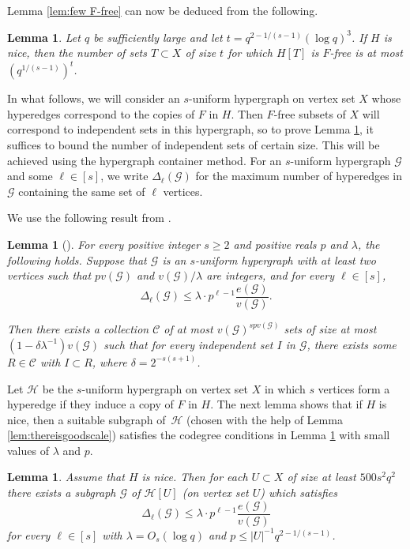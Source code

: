 \documentclass[11pt]{article}
\theoremstyle{plain}
\newtheorem{lemma}[theorem]{Lemma}
\theoremstyle{definition}
\begin{document}
Lemma \ref{lem:few F-free} can now be deduced from the following.

\begin{lemma} \label{lem:few F-free if nice}
    Let $q$ be sufficiently large and let $t=q^{2-1/(s-1)}(\log q)^{3}$. If $H$ is nice, then the number of sets $T\subset X$ of size $t$ for which $H[T]$ is $F$-free is at most $(q^{1/(s-1)})^t$.
\end{lemma}

In what follows, we will consider an $s$-uniform hypergraph on vertex set $X$ whose hyperedges correspond to the copies of $F$ in $H$. Then $F$-free subsets of $X$ will correspond to independent sets in this hypergraph, so to prove Lemma \ref{lem:few F-free if nice}, it suffices to bound the number of independent sets of certain size. This will be achieved using the hypergraph container method. For an $s$-uniform hypergraph $\mathcal{G}$ and some $\ell \in [s]$, we write $\Delta_{\ell}(\mathcal{G})$ for the maximum number of hyperedges in $\mathcal{G}$ containing the same set of $\ell$ vertices.

We use the following result from \cite{Janzer_Sudakov}.

\begin{lemma}[{\cite[Corollary 2.8]{Janzer_Sudakov}}] \label{lem:BMScontainer}
    For every positive integer $s\geq 2$ and positive reals $p$ and $\lambda$, the following holds. Suppose that $\mathcal{G}$ is an $s$-uniform hypergraph with at least two vertices such that $pv(\mathcal{G})$ and $v(\mathcal{G})/\lambda$ are integers, and for every $\ell\in [s]$,
    $$\Delta_{\ell}(\mathcal{G})\leq \lambda\cdot p^{\ell-1}\frac{e(\mathcal{G})}{v(\mathcal{G})}.$$

    Then there exists a collection $\mathcal{C}$ of at most $v(\mathcal{G})^{spv(\mathcal{G})}$ sets of size at most $(1-\delta \lambda^{-1})v(\mathcal{G})$ such that for every independent set $I$ in $\mathcal{G}$, there exists some $R\in \mathcal{C}$ with $I\subset R$, where $\delta=2^{-s(s+1)}$.
\end{lemma}

Let $\mathcal{H}$ be the $s$-uniform hypergraph on vertex set $X$ in which $s$ vertices form a hyperedge if they induce a copy of $F$ in $H$. The next lemma shows that if $H$ is nice, then a suitable subgraph of~$\mathcal{H}$ (chosen with the help of Lemma \ref{lem:thereisgoodscale}) satisfies the codegree conditions in Lemma \ref{lem:BMScontainer} with small values of $\lambda$ and $p$.

\begin{lemma} \label{lem:bounded degree}
    Assume that $H$ is nice. Then for each $U\subset X$ of size at least $500s^2q^2$ there exists a subgraph $\mathcal{G}$ of $\mathcal{H}[U]$ (on vertex set $U$) which satisfies
    \begin{equation}
        \Delta_{\ell}(\mathcal{G})\leq \lambda\cdot p^{\ell-1}\frac{e(\mathcal{G})}{v(\mathcal{G})} \label{eqn:bounded codegrees}
    \end{equation}
    for every $\ell\in [s]$ with $\lambda=O_s(\log q)$ and $p\leq |U|^{-1}q^{2-1/(s-1)}$.
\end{lemma}
\end{document}
